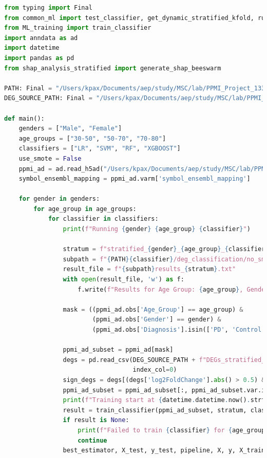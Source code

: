 \documentclass[12pt]{report}
\begin{document}
    \begin{lstlisting}[language=Python,caption={ML\_stratified\_central.py: Κεντρικό σενάριο μάθησης και εκτέλεσης ταξινομητών}, label=lst:mlstratifiedcentral]
from typing import Final
from common_ml import test_classifier, get_dynamic_stratified_kfold, run_10x_fold_validation, plot_results
from ML_training import train_classifier
import anndata as ad
import datetime
import pandas as pd
from shap_analysis_stratified import generate_shap_beeswarm

PATH: Final = "/Users/kpax/Documents/aep/study/MSC/lab/PPMI_Project_133_RNASeq/data/ml/classification/"
DEG_SOURCE_PATH: Final = "/Users/kpax/Documents/aep/study/MSC/lab/PPMI_Project_133_RNASeq/data/deg_consolidated_visits/"

def main():
    genders = ["Male", "Female"]
    age_groups = ["30-50", "50-70", "70-80"]
    classifiers = ["LR", "SVM", "RF", "XGBOOST"]
    use_smote = False
    ppmi_ad = ad.read_h5ad("/Users/kpax/Documents/aep/study/MSC/lab/PPMI_Project_133_RNASeq/ppmi_adata.h5ad")
    symbol_ensembl_mapping = ppmi_ad.varm['symbol_ensembl_mapping']

    for gender in genders:
        for age_group in age_groups:
            for classifier in classifiers:
                print(f"Running {gender} {age_group} {classifier}")

                stratum = f"stratified_{gender}_{age_group}_{classifier}_useSMOTE_{use_smote}"
                subpath = f"{PATH}{classifier}/deg_classification/no_smote/"
                result_file = f"{subpath}results_{stratum}.txt"
                with open(result_file, 'w') as f:
                    f.write(f"Results for Age Group: {age_group}, Gender: {gender}\n\n")

                mask = ((ppmi_ad.obs['Age_Group'] == age_group) &
                        (ppmi_ad.obs['Gender'] == gender) &
                        (ppmi_ad.obs['Diagnosis'].isin(['PD', 'Control'])))

                ppmi_ad_subset = ppmi_ad[mask]
                degs = pd.read_csv(DEG_SOURCE_PATH + f"DEGs_stratified_consoVisits_{gender}_{age_group}.csv",
                                   index_col=0)
                sign_degs = degs[(degs['log2FoldChange'].abs() > 0.5) & (degs['padj'] < 0.05)]
                ppmi_ad_subset = ppmi_ad_subset[:, ppmi_ad_subset.var.index.isin(sign_degs.index.tolist())]
                print(f"Training start at {datetime.datetime.now().strftime('%Y-%m-%d %H:%M:%S')}")
                result = train_classifier(ppmi_ad_subset, stratum, classifier, subpath, use_smote)
                if result is None:
                    print(f"Failed to train {classifier} for {age_group} - skipping")
                    continue
                best_estimator, X_test, y_test, pipeline, X, y, X_train = result


\end{lstlisting}
\end{document}
